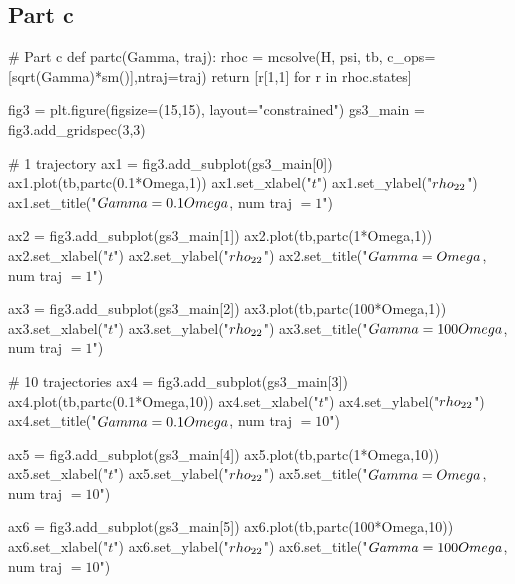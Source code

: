 \subsection*{Part c}
\begin{python}
# Part c
def partc(Gamma, traj):
    rhoc = mcsolve(H, psi, tb, c_ops=[sqrt(Gamma)*sm()],ntraj=traj)
    return [r[1,1] for r in rhoc.states]
    
fig3 = plt.figure(figsize=(15,15), layout="constrained")
gs3_main = fig3.add_gridspec(3,3)

# 1 trajectory
ax1 = fig3.add_subplot(gs3_main[0])
ax1.plot(tb,partc(0.1*Omega,1))
ax1.set_xlabel("$t$")
ax1.set_ylabel("$\\rho_{22}$")
ax1.set_title("$\\Gamma = 0.1\\Omega$, num traj $= 1$")

ax2 = fig3.add_subplot(gs3_main[1])
ax2.plot(tb,partc(1*Omega,1))
ax2.set_xlabel("$t$")
ax2.set_ylabel("$\\rho_{22}$")
ax2.set_title("$\\Gamma = \\Omega$, num traj $= 1$")

ax3 = fig3.add_subplot(gs3_main[2])
ax3.plot(tb,partc(100*Omega,1))
ax3.set_xlabel("$t$")
ax3.set_ylabel("$\\rho_{22}$")
ax3.set_title("$\\Gamma = 100\\Omega$, num traj $= 1$")

# 10 trajectories
ax4 = fig3.add_subplot(gs3_main[3])
ax4.plot(tb,partc(0.1*Omega,10))
ax4.set_xlabel("$t$")
ax4.set_ylabel("$\\rho_{22}$")
ax4.set_title("$\\Gamma = 0.1\\Omega$, num traj $= 10$")

ax5 = fig3.add_subplot(gs3_main[4])
ax5.plot(tb,partc(1*Omega,10))
ax5.set_xlabel("$t$")
ax5.set_ylabel("$\\rho_{22}$")
ax5.set_title("$\\Gamma = \\Omega$, num traj $= 10$")

ax6 = fig3.add_subplot(gs3_main[5])
ax6.plot(tb,partc(100*Omega,10))
ax6.set_xlabel("$t$")
ax6.set_ylabel("$\\rho_{22}$")
ax6.set_title("$\\Gamma = 100\\Omega$, num traj $= 10$")


\end{python}

